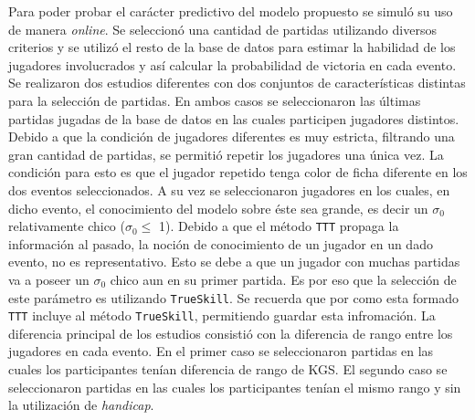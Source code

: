 \documentclass[11pt,twoside,spanish]{report} %
\begin{document}
Para poder probar el car\'acter predictivo del modelo propuesto se simul\'o su uso de manera \textit{online}.
Se seleccion\'o una cantidad de partidas utilizando diversos criterios y se utiliz\'o el resto de la base de datos para estimar la habilidad de los jugadores involucrados y as\'i calcular la probabilidad de victoria en cada evento.
Se realizaron dos estudios diferentes con dos conjuntos de caracter\'isticas distintas para la selecci\'on de  partidas.
En ambos casos se seleccionaron las \'ultimas partidas jugadas de la base de datos en las cuales participen jugadores distintos.
Debido a que la condici\'on de jugadores diferentes es muy estricta, filtrando una gran cantidad de partidas, se permiti\'o repetir los jugadores una \'unica vez.
La condici\'on para esto es que el jugador repetido tenga color de ficha diferente en los dos eventos seleccionados.
A su vez se seleccionaron jugadores en los cuales, en dicho evento, el conocimiento del modelo sobre \'este sea grande, es decir un $\sigma_0$ relativamente chico ($\sigma_0 \leq$ 1).
Debido a que el m\'etodo \texttt{TTT} propaga la informaci\'on al pasado, la noci\'on de conocimiento de un jugador en un dado evento, no es representativo.
Esto se debe a que un jugador con muchas partidas va a poseer un $\sigma_0$ chico aun en su primer partida.
Es por eso que la selecci\'on de este par\'ametro es utilizando \texttt{TrueSkill}.
Se recuerda que por como esta formado \texttt{TTT} incluye al m\'etodo \texttt{TrueSkill}, permitiendo guardar esta infromaci\'on.
La diferencia principal de los estudios consisti\'o con la diferencia de rango entre los jugadores en cada evento.
En el primer caso se seleccionaron partidas en las cuales los participantes ten\'ian diferencia de rango de KGS.
El segundo caso se seleccionaron partidas en las cuales los participantes ten\'ian el mismo rango y sin la utilizaci\'on de \textit{handicap}. 
\end{document}
